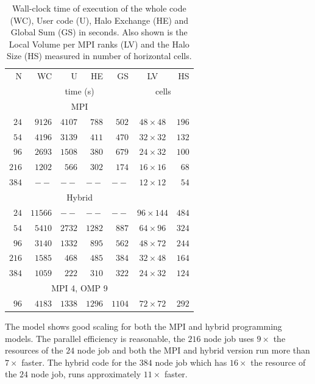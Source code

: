\begin{table}
\centering
\caption{\label{tab:scale-data}Wall-clock time of execution of the whole code (WC), User
  code (U), Halo Exchange (HE) and Global Sum (GS) in seconds. Also
  shown is the Local Volume per MPI ranks (LV) and the Halo Size (HS)
  measured in number of horizontal cells.}
\begin{tabular}{r|rrrr|cr}
N & WC & U & HE & GS & LV & HS  \\
    & \multicolumn{4}{c|}{time (s)} & \multicolumn{2}{c}{cells} \\ \hline\hline
     &  \multicolumn{4}{c|}{MPI}& \\
$24$  & $9126$ & $4107$ & $788$ & $502$ & $48\times 48$ & $196$ \\
$54$  & $4196$ & $3139$ & $411$ & $470$ & $32\times 32$ & $132$ \\ 
$96$  & $2693$ & $1508$ & $380$ & $679$ & $24\times 32$ & $100$ \\ 
$216$ & $1202$ & $566$  & $302$ & $174$ & $16\times 16$ & $68$  \\ 
$384$ & $--$   & $--$   & $--$  & $--$  & $12\times 12$ & $54$ \\\hline
  & \multicolumn{4}{c|}{Hybrid} & \\
$24$ &$11566$ & $--$    & $--$  & $--$ & $96\times 144$ & $484$ \\
$54$ & $5410$  & $2732$ & $1282$ & $887$ & $64\times 96$ & $324$ \\
$96$ &$3140$  & $1332$ & $895$ & $562$ & $48\times 72$ & $244$ \\
$216$ &$1585$  & $468$ & $485$ & $384$ & $32\times 48$ & $164$ \\
$384$ &$1059$  & $222$ & $310$ & $322$ & $24\times 32$ & $124$
  \\\hline
  & \multicolumn{4}{c|}{MPI 4, OMP 9} & \\ 
$96$ & $4183$ & $1338$ & $1296$ & $1104$ & $72\times 72$ & $292$ \\ \hline
\end{tabular}
\end{table}

The model shows good scaling for both the MPI and hybrid programming
models. The parallel efficiency is reasonable, the $216$ node job uses
$9\times $ the resources of the $24$ node job and both the MPI and
hybrid version run more than $7\times $ faster. The hybrid code for the
$384$ node job which has $16\times $ the resource of the $24$ node
job, runs approximately $11 \times$ faster.


